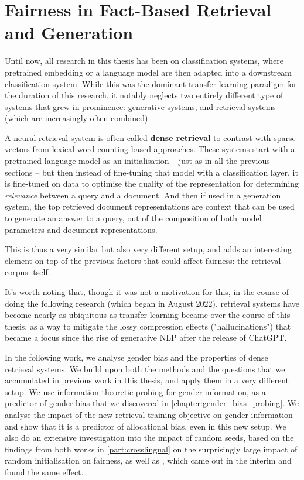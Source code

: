 \part{Fairness in Fact-Based Retrieval and Generation}
\label{part:generation}




Until now, all research in this thesis has been on classification systems, where pretrained embedding or a language model are then adapted into a downstream classification system. 
While this was the dominant transfer learning paradigm for the duration of this research, it notably neglects two entirely different type of systems that grew in prominence: generative systems, and retrieval systems (which are increasingly often combined).

A neural retrieval system is often called \textbf{dense retrieval} to contrast with sparse vectors from lexical word-counting based approaches. These systems start with a pretrained language model as an initialisation -- just as in all the previous sections -- but then instead of fine-tuning that model with a classification layer, it is fine-tuned on data to optimise the quality of the representation for determining \textit{relevance} between a query and a document. And then if used in a generation system, the top retrieved document representations are context that can be used to generate an answer to a query, out of the composition of both model parameters and document representations. 

This is thus a very similar but also very different setup, and adds an interesting element on top of the previous factors that could affect fairness: the retrieval corpus itself. 

It's worth noting that, though it was not a motivation for this, in the course of doing the following research (which began in August 2022), retrieval systems have become nearly as ubiquitous as transfer learning became over the course of this thesis, as a way to mitigate the lossy compression effects ("hallucinations") that became a focus since the rise of generative NLP after the release of ChatGPT. 


In the following work, we analyse gender bias and the properties of dense retrieval systems. We build upon both the methods and the questions that we accumulated in previous work in this thesis, and apply them in a very different setup. We use information theoretic probing for gender information, as a predictor of gender bias that we discovered in \ref{chapter:gender_bias_probing}. We analyse the impact of the new retrieval training objective on gender information and show that it is a predictor of allocational bias, even in this new setup. We also do an extensive investigation into the impact of random seeds, based on the findings from both works in \ref{part:crosslingual} on the surprisingly large impact of random initialisation on fairness, as well as \citet{multiberts}, which came out in the interim and found the same effect.

